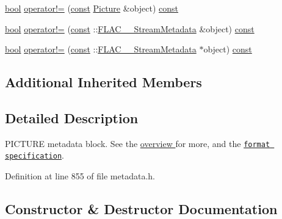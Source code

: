 {\bf }\par
\begin{DoxyCompactItemize}
\item 
\hyperlink{mac_2config_2i386_2lib-src_2libsoxr_2soxr-config_8h_abb452686968e48b67397da5f97445f5b}{bool} \hyperlink{class_f_l_a_c_1_1_metadata_1_1_picture_afa4be54429fc22789d2251b165cb47e9}{operator!=} (\hyperlink{getopt1_8c_a2c212835823e3c54a8ab6d95c652660e}{const} \hyperlink{class_f_l_a_c_1_1_metadata_1_1_picture}{Picture} \&object) \hyperlink{getopt1_8c_a2c212835823e3c54a8ab6d95c652660e}{const} 
\item 
\hyperlink{mac_2config_2i386_2lib-src_2libsoxr_2soxr-config_8h_abb452686968e48b67397da5f97445f5b}{bool} \hyperlink{class_f_l_a_c_1_1_metadata_1_1_picture_aa7cc7be3cde674d232192aec1242943b}{operator!=} (\hyperlink{getopt1_8c_a2c212835823e3c54a8ab6d95c652660e}{const} \+::\hyperlink{struct_f_l_a_c_____stream_metadata}{F\+L\+A\+C\+\_\+\+\_\+\+Stream\+Metadata} \&object) \hyperlink{getopt1_8c_a2c212835823e3c54a8ab6d95c652660e}{const} 
\item 
\hyperlink{mac_2config_2i386_2lib-src_2libsoxr_2soxr-config_8h_abb452686968e48b67397da5f97445f5b}{bool} \hyperlink{class_f_l_a_c_1_1_metadata_1_1_picture_a5f06bc498ad83582a601562180eb6211}{operator!=} (\hyperlink{getopt1_8c_a2c212835823e3c54a8ab6d95c652660e}{const} \+::\hyperlink{struct_f_l_a_c_____stream_metadata}{F\+L\+A\+C\+\_\+\+\_\+\+Stream\+Metadata} $\ast$object) \hyperlink{getopt1_8c_a2c212835823e3c54a8ab6d95c652660e}{const} 
\end{DoxyCompactItemize}

\subsection*{Additional Inherited Members}


\subsection{Detailed Description}
P\+I\+C\+T\+U\+RE metadata block. See the \hyperlink{group__flacpp__metadata__object}{overview } for more, and the \href{../format.html#metadata_block_picture}{\tt format specification}. 

Definition at line 855 of file metadata.\+h.



\subsection{Constructor \& Destructor Documentation}
